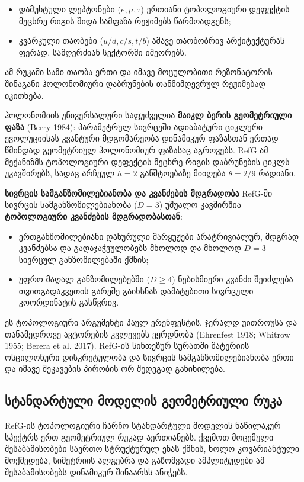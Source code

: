 \documentclass[11pt,a4paper]{article}
\begin{document}
\begin{itemize}
\item დამუხტული ლეპტონები ($e, \mu, \tau$) ერთიანი ტოპოლოგიური დეფექტის მეცხრე რიგის შიდა სამფაზა რეჟიმებს წარმოადგენს;
\item კვარკული თაობები ($u/d, c/s, t/b$) ამავე თაობობრივ არქიტექტურას ფერად, სამღერძიან სექტორში იმეორებს.

\end{itemize}
ამ რუკაში სამი თაობა ერთი და იმავე მოცულობითი რეზონატორის შინაგანი ჰოლონომიური დაბრუნების თანმიმდევრულ რეჟიმებად იკითხება.

ჰოლონომიის უნივერსალური საფუძველია \textbf{მაიკლ ბერის გეომეტრიული ფაზა} (Berry 1984): პარამეტრულ სივრცეში ადიაბატური ციკლური ევოლუციისას კვანტური მდგომარეობა დინამიკურ ფაზასთან ერთად წმინდად გეომეტრიულ ჰოლონომიურ ფაზასაც აგროვებს. RefG ამ მექანიზმს ტოპოლოგიური დეფექტის მეცხრე რიგის დაბრუნების ციკლს უკავშირებს, სადაც არჩეულ $h=2$ განშტოებაზე მიიღება $\theta=2/9$ რადიანი.

\textbf{სივრცის სამგანზომილებიანობა და კვანძების მდგრადობა}
RefG-ში სივრცის სამგანზომილებიანობა ($D=3$) უშუალო კავშირშია \textbf{ტოპოლოგიური კვანძების მდგრადობასთან}:

\begin{itemize}
\item ერთგანზომილებიანი დახურული მარყუჟები არატრივიალურ, მდგრად კვანძებსა და გადაჯაჭვულობებს მხოლოდ და მხოლოდ $D=3$ სივრცულ განზომილებაში ქმნის;
\item უფრო მაღალ განზომილებებში ($D \ge 4$) ნებისმიერი კვანძი შეიძლება თვითგადაკვეთის გარეშე გაიხსნას დამატებითი სივრცული კოორდინატის გასწვრივ.

\end{itemize}
ეს ტოპოლოგიური არგუმენტი პაულ ერენფესტის, ჯერალდ უითროუსა და თანამედროვე ავტორების კვლევებს ეყრდნობა (Ehrenfest 1918; Whitrow 1955; Berera et al. 2017). RefG-ის სინთეზურ სურათში მატერიის ოსცილონური დისკრეტულობა და სივრცის სამგანზომილებიანობა ერთი და იმავე შეკავების პირობის ორ შედეგად განიხილება.


\subsection{სტანდარტული მოდელის გეომეტრიული რუკა}

RefG-ის ტოპოლოგიური ჩარჩო სტანდარტული მოდელის ნაწილაკურ სპექტრს ერთ გეომეტრიულ რუკად აერთიანებს. ქვემოთ მოცემული შესაბამისობები საერთო სტრუქტურულ ენას ქმნის, ხოლო კოვარიანტული მოქმედება, სიმეტრიის ალგებრა და გაზომვადი ამპლიტუდები ამ შესაბამისობებს დინამიკურ შინაარსს ანიჭებს.
\end{document}
